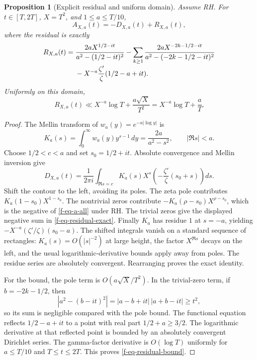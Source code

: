 \documentclass[11pt,a4paper]{article}
\newtheorem{proposition}[theorem]{Proposition}
\theoremstyle{definition}
\theoremstyle{remark}
\begin{document}
\begin{proposition}[Explicit residual and uniform domain]
\label{f-prop-explicit-transfer}
Assume RH.  For $t\in[T,2T]$, $X=T^2$, and $1\le a\le T/10$,
\begin{equation}
 A_{X,a}(t)=-D_{X,a}(t)+R_{X,a}(t),
 \label{f-eq-a-d}
\end{equation}
where the residual is exactly
\begin{align}
 R_{X,a}(t)={}&
 \frac{2aX^{1/2-it}}{a^2-(1/2-it)^2}
 -\sum_{k\ge1}
 \frac{2aX^{-2k-1/2-it}}{a^2-(-2k-1/2-it)^2}
 \notag\\[-2pt]
 &-X^{-a}\frac{\zeta'}{\zeta}(1/2-a+it).
 \label{f-eq-residual-exact}
\end{align}
Uniformly on this domain,
\begin{equation}
 R_{X,a}(t)\ll X^{-a}\log T+\frac{a\sqrt X}{T^2}
 =X^{-a}\log T+\frac aT.
 \label{f-eq-residual-bound}
\end{equation}
\end{proposition}

\begin{proof}
The Mellin transform of $w_a(y)=e^{-a|\log y|}$ is
\[
 K_a(s)=\int_0^\infty w_a(y)y^{s-1}\,dy
 =\frac{2a}{a^2-s^2},\qquad |\Re s|<a.
\]
Choose $1/2<c<a$ and set $s_0=1/2+it$.  Absolute convergence and Mellin
inversion give
\[
 D_{X,a}(t)=\frac1{2\pi i}\int_{\Re s=c}
 K_a(s)X^s\left(-\frac{\zeta'}{\zeta}(s_0+s)\right)ds.
\]
Shift the contour to the left, avoiding its poles.  The zeta pole contributes
$K_a(1-s_0)X^{1-s_0}$.  The nontrivial zeros contribute
$-K_a(\rho-s_0)X^{\rho-s_0}$, which is the negative of
\eqref{f-eq-a-all} under RH.  The trivial zeros give the displayed negative
sum in \eqref{f-eq-residual-exact}.  Finally $K_a$ has residue $1$ at
$s=-a$, yielding $-X^{-a}(\zeta'/\zeta)(s_0-a)$.  The shifted integrals
vanish on a standard sequence of rectangles: $K_a(s)=O(|s|^{-2})$ at
large height, the factor $X^{\Re s}$ decays on the left, and the usual
logarithmic-derivative bounds apply away from poles.  The residue series
are absolutely convergent.  Rearranging proves the exact identity.

For the bound, the pole term is $O(a\sqrt X/T^2)$.  In the trivial-zero
term, if $b=-2k-1/2$, then
\[
 |a^2-(b-it)^2|=|a-b+it|\,|a+b-it|\ge t^2,
\]
so its sum is negligible compared with the pole bound.  The functional
equation reflects $1/2-a+it$ to a point with real part $1/2+a\ge3/2$.
The logarithmic derivative at that reflected point is bounded by an
absolutely convergent Dirichlet series.  The gamma-factor derivative is
$O(\log T)$ uniformly for $a\le T/10$ and $T\le t\le2T$.
This proves \eqref{f-eq-residual-bound}.
\end{proof}
\end{document}
